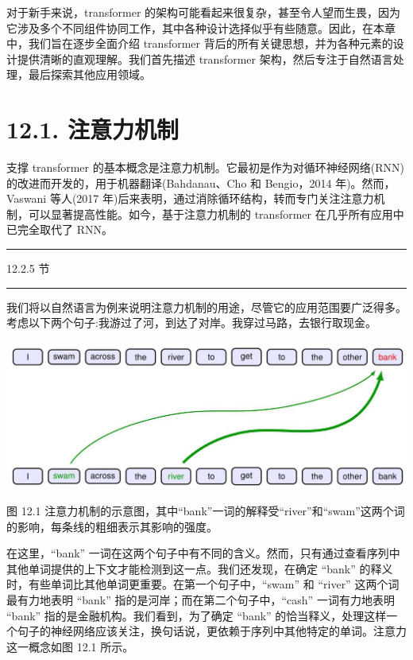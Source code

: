 \documentclass[10pt]{article}
\newcommand{\HRule}{\begin{center}\rule{0.9\linewidth}{0.2mm}\end{center}}
\begin{document}
对于新手来说，transformer 的架构可能看起来很复杂，甚至令人望而生畏，因为它涉及多个不同组件协同工作，其中各种设计选择似乎有些随意。因此，在本章中，我们旨在逐步全面介绍 transformer 背后的所有关键思想，并为各种元素的设计提供清晰的直观理解。我们首先描述 transformer 架构，然后专注于自然语言处理，最后探索其他应用领域。

\section*{12.1. 注意力机制}

支撑 transformer 的基本概念是注意力机制。它最初是作为对循环神经网络(RNN)的改进而开发的，用于机器翻译(Bahdanau、Cho 和 Bengio，2014 年)。然而，Vaswani 等人(2017 年)后来表明，通过消除循环结构，转而专门关注注意力机制，可以显著提高性能。如今，基于注意力机制的 transformer 在几乎所有应用中已完全取代了 RNN。

\HRule

12.2.5 节

\HRule

我们将以自然语言为例来说明注意力机制的用途，尽管它的应用范围要广泛得多。考虑以下两个句子:我游过了河，到达了对岸。我穿过马路，去银行取现金。

\begin{center}
\includegraphics[max width=1.0\textwidth]{images/0194e279-9b28-703a-88f4-c3ac21e2010d_378_248_338_1294_475_0.jpg}
\end{center}
\hspace*{3em} 

图 12.1 注意力机制的示意图，其中“bank”一词的解释受“river”和“swam”这两个词的影响，每条线的粗细表示其影响的强度。

在这里，“bank” 一词在这两个句子中有不同的含义。然而，只有通过查看序列中其他单词提供的上下文才能检测到这一点。我们还发现，在确定 “bank” 的释义时，有些单词比其他单词更重要。在第一个句子中，“swam” 和 “river” 这两个词最有力地表明 “bank” 指的是河岸；而在第二个句子中，“cash” 一词有力地表明 “bank” 指的是金融机构。我们看到，为了确定 “bank” 的恰当释义，处理这样一个句子的神经网络应该关注，换句话说，更依赖于序列中其他特定的单词。注意力这一概念如图 12.1 所示。
\end{document}
